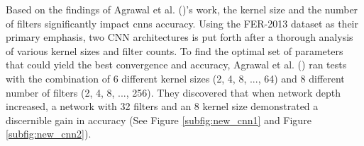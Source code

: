 \indent Based on the findings of Agrawal et al. (\citeyear{agrawal_2019_using})'s work, the kernel size and the number of filters significantly impact \gls{cnns} accuracy.
Using the FER-2013 dataset as their primary emphasis, two CNN architectures is put forth after a thorough analysis of various kernel sizes and filter counts.
To find the optimal set of parameters that could yield the best convergence and accuracy, Agrawal et al. (\citeyear{agrawal_2019_using}) ran tests with the combination of 6 different kernel sizes (2, 4, 8, ..., 64) and 8 different number of filters (2, 4, 8, ..., 256). 
They discovered that when network depth increased, a network with 32 filters and an 8 kernel size demonstrated a discernible gain in accuracy (See Figure \ref{subfig:new_cnn1} and Figure \ref{subfig:new_cnn2}).
\begin{figure}[H]
    \centering
    \qquad
    \vspace{0.5cm}
    \\
    \scriptsize{\citep{agrawal_2019_using}}
\end{figure}
